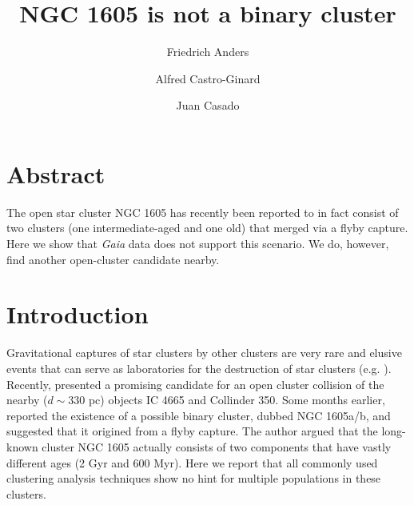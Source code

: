 \documentclass[RNAAS]{aastex631}
\begin{document}
\title{NGC 1605 is not a binary cluster}


\author[0000-0003-4524-9363]{Friedrich Anders}

\author[0000-0002-9419-3725]{Alfred Castro-Ginard}

\author[0000-0003-4105-2520]{Juan Casado}



\section{Abstract}
The open star cluster NGC 1605 has recently been reported to in fact consist of two clusters (one intermediate-aged and one old) that merged via a flyby capture. Here we show that {\it Gaia} data does not support this scenario. We do, however, find another open-cluster candidate nearby.

\section{Introduction}
Gravitational captures of star clusters by other clusters are very rare and elusive events that can serve as laboratories for the destruction of star clusters (e.g. \citealt{Soubiran2018, Casado2022}). Recently, \citet{Piatti2022} presented a promising candidate for an open cluster collision of the nearby ($d\sim330$ pc) objects IC 4665 and Collinder 350.
Some months earlier, \citet{Camargo2021} reported the existence of a possible binary cluster, dubbed NGC 1605a/b, and suggested that it origined from a flyby capture. The author argued that the long-known cluster NGC 1605 actually consists of two components that have vastly different ages (2 Gyr and 600 Myr). Here we report that all commonly used clustering analysis techniques show no hint for multiple populations in these clusters.
\end{document}
